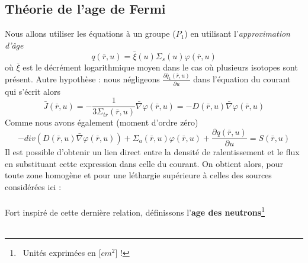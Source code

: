 	\subsection{Théorie de l'age de Fermi}
	Nous allons utiliser les équations à un groupe ($P_1$) en utilisant l'\textit{approximation 
	d'âge}
	\begin{equation}
	q(\bar r,u) = \bar \xi (u){\Sigma _s}(u)\varphi (\bar r,u)
	\end{equation}
	où $\bar\xi$ est le décrément logarithmique moyen dans le cas où plusieurs isotopes sont présent. 
	Autre hypothèse : nous négligeons $\frac{{\partial {{\bar q}_1}(\bar r,u)}}{{\partial u}}$ dans
	l'équation du courant qui s'écrit alors
	\begin{equation}
	\bar J(\bar r,u) =  - \frac{1}{{3{\Sigma _{tr}}(\bar r,u)}}\bar \nabla \varphi (\bar r,u) =  -
	 D(\bar r,u)\bar \nabla \varphi (\bar r,u)
	\end{equation}
	Comme nous avons également (moment d'ordre zéro)
	\begin{equation}
	 - div(D(\bar r,u)\bar \nabla \varphi (\bar r,u)) + {\Sigma _a}(\bar r,u)\varphi (\bar r,u) +
	  \frac{{\partial q(\bar r,u)}}{{\partial u}} = S(\bar r,u)
	\end{equation}		
	Il est possible d'obtenir un lien direct entre la densité de ralentissement et le flux en 
	substituant cette expression dans celle du courant. On obtient alors, pour toute zone homogène et 
	pour une léthargie supérieure à celles des sources considérées ici :\\
	
	\ \\
	
	Fort inspiré de cette dernière relation, définissons l'\textbf{age des neutrons}\footnote{\danger\ 
	Unités exprimées en [$cm^2$] !} \ \\
	
	\cadre{\begin{equation}
	\tau (u) \equiv \int_o^u  \frac{{D(u')}}{{\bar \xi (u'){\Sigma _s}(u')}}du'
	\end{equation}}\ \\
	
